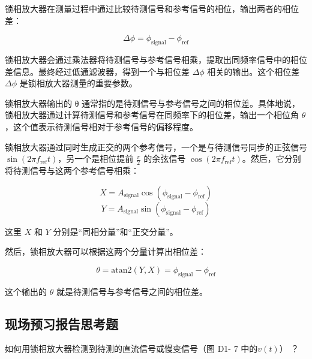\documentclass[dvipsnames, svgnames,a4paper,11pt]{article}
\begin{document}
锁相放大器在测量过程中通过比较待测信号和参考信号的相位，输出两者的相位差：

\[
\Delta \phi = \phi_{\text{signal}} - \phi_{\text{ref}}
\]

锁相放大器会通过乘法器将待测信号与参考信号相乘，提取出同频率信号中的相位差信息。最终经过低通滤波器，得到一个与相位差 \( \Delta \phi \) 相关的输出。这个相位差 \( \Delta \phi \) 是锁相放大器测量的重要参数。

锁相放大器输出的 θ 通常指的是待测信号与参考信号之间的相位差。具体地说，锁相放大器通过计算待测信号和参考信号在同频率下的相位差，输出一个相位角 \( \theta \)，这个值表示待测信号相对于参考信号的偏移程度。

锁相放大器通过同时生成正交的两个参考信号，一个是与待测信号同步的正弦信号 \( \sin(2\pi f_{\text{ref}} t) \)，另一个是相位提前 \( \frac{\pi}{2} \) 的余弦信号 \( \cos(2\pi f_{\text{ref}} t) \)。然后，它分别将待测信号与这两个参考信号相乘：

\[
X = A_{\text{signal}} \cos(\phi_{\text{signal}} - \phi_{\text{ref}})
\]
\[
Y = A_{\text{signal}} \sin(\phi_{\text{signal}} - \phi_{\text{ref}})
\]

这里 \( X \) 和 \( Y \) 分别是“同相分量”和“正交分量”。

然后，锁相放大器可以根据这两个分量计算出相位差：

\[
\theta = \text{atan2}(Y, X) = \phi_{\text{signal}} - \phi_{\text{ref}}
\]

这个输出的 \( \theta \) 就是待测信号与参考信号之间的相位差。












\subsection{现场预习报告思考题}

\begin{question}
	如何用锁相放大器检测到待测的直流信号或慢变信号（图 D1- 7 中的$v(t)$） ？
\end{question}
\end{document}
